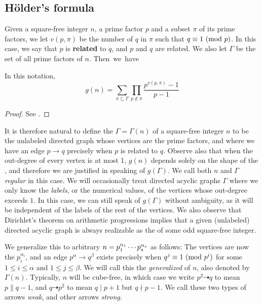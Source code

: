 \subsection{Hölder's formula}
Given a square-free integer $n$, a prime factor $p$ and a subset $\pi$ of its prime factors, we let $v(p, \pi)$ be the number of $q$ in $\pi$ such that $q \equiv 1 \ (\mathrm{mod} \ p)$.
In this case, we say that $p$ is \textbf{related} to $q$, and $p$ and $q$ are related.
We also let $\Gamma$ be the set of all prime factors of $n$.
\mbox{Then we have}
\begin{thm} In this notation,
	\begin{equation*}
		g(n) = \sum_{\pi \subseteq \Gamma} \prod_{p \notin \pi} \frac{p^{v(p, \pi)} - 1}{p - 1}
	\end{equation*}
\end{thm}
\begin{proof} See {\cite[Thm.~5.1]{gnumoas}}.
\end{proof}

It is therefore natural to define the \emph{} $\Gamma = \Gamma(n)$ of a square-free integer $n$ to be the unlabeled directed graph whose vertices are the prime factors, and where we have an edge $p \to q$ precisely when $p$ is related to $q$.
Observe also that when the out-degree of every vertex is at most 1, $g(n)$ depends solely on the shape of the , and therefore we are justified in speaking of $g(\Gamma)$.
We call both $n$ and $\Gamma$ \emph{regular} in this case.
We will occasionally treat directed acyclic graphs $\Gamma$ where we only know the \emph{labels}, or the numerical values, of the vertices whose out-degree exceeds $1$.
In this case, we can still speak of $g(\Gamma)$ without ambiguity, as it will be independent of the labels of the rest of the vertices.
We also observe that Dirichlet's theorem on arithmetic progressions implies that a given (unlabeled) directed acyclic graph is always realizable as the  of some odd square-free integer.

We generalize this to arbitrary $n = p_1^{\alpha_1} \cdots p_s^{\alpha_s}$ as follows: The vertices are now the $p_i^{\alpha_i}$, and an edge $p^\alpha \to q^\beta$ exists precisely when $q^j \equiv 1 \ (\mathrm{mod} \ p^i)$ for some $1 \le i \le \alpha$ and $1 \le j \le \beta$.
We will call this the \emph{generalized \hg} of $n$, also denoted by $\Gamma(n)$.
Typically, $n$ will be cube-free, in which case we write $p^2 \dashrightarrow q$ to mean $p \parallel q - 1$, and $q \dashrightarrow p^2$ to mean $q \mid p + 1$ but $q \nmid p - 1$.
We call these two types of arrows \emph{weak}, and other arrows \emph{strong}.

